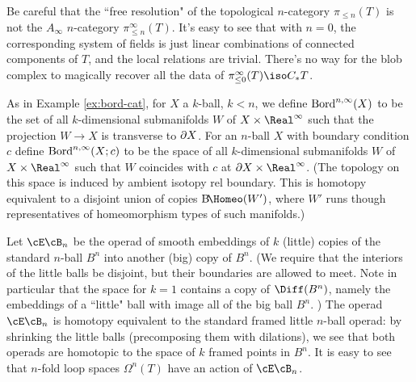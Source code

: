 Be careful that the ``free resolution" of the topological $n$-category $\pi_{\leq n}(T)$ is not the $A_\infty$ $n$-category $\pi^\infty_{\leq n}(T)$.
It's easy to see that with $n=0$, the corresponding system of fields is just 
linear combinations of connected components of $T$, and the local relations are trivial.
There's no way for the blob complex to magically recover all the data of $\pi^\infty_{\leq 0}(T) \iso C_* T$.

\begin{example}
\rm
\label{ex:bordism-category-ainf}
As in Example \ref{ex:bord-cat}, for $X$ a $k$-ball, $k<n$, we define $\operatorname{Bord}^{n,\infty}(X)$
to be the set of all $k$-dimensional
submanifolds $W$ of $X\times \Real^\infty$ such that the projection $W \to X$ is transverse
to $\partial X$.
For an $n$-ball $X$ with boundary condition $c$ 
define $\operatorname{Bord}^{n,\infty}(X; c)$ to be the space of all $k$-dimensional
submanifolds $W$ of $X\times \Real^\infty$ such that 
$W$ coincides with $c$ at $\bd X \times \Real^\infty$.
(The topology on this space is induced by ambient isotopy rel boundary.
This is homotopy equivalent to a disjoint union of copies $\mathrm{B}\!\Homeo(W')$, where
$W'$ runs though representatives of homeomorphism types of such manifolds.)
\end{example}



Let $\cE\cB_n$ be the operad of smooth embeddings of $k$ (little)
copies of the standard $n$-ball $B^n$ into another (big) copy of $B^n$.
(We require that the interiors of the little balls be disjoint, but their 
boundaries are allowed to meet.
Note in particular that the space for $k=1$ contains a copy of $\Diff(B^n)$, namely
the embeddings of a ``little" ball with image all of the big ball $B^n$.
)
The operad $\cE\cB_n$ is homotopy equivalent to the standard framed little $n$-ball operad:
by shrinking the little balls (precomposing them with dilations), 
we see that both operads are homotopic to the space of $k$ framed points
in $B^n$.
It is easy to see that $n$-fold loop spaces $\Omega^n(T)$  have
an action of $\cE\cB_n$.

